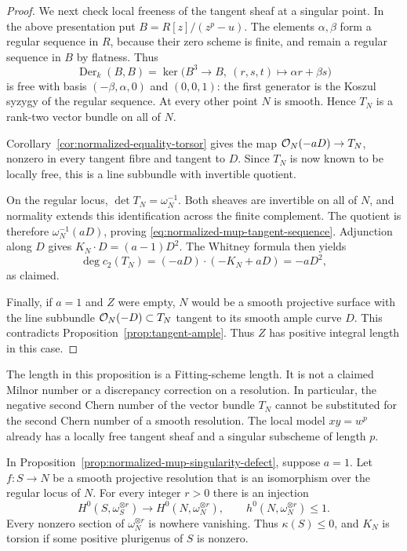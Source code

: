 \begin{proof}
We next check local freeness of the tangent sheaf at a singular
point. In the above presentation put $B=R[z]/(z^p-u)$.
The elements $\alpha,\beta$ form a regular sequence in $R$,
because their zero scheme is finite, and remain a regular sequence
in $B$ by flatness. Thus
\[
 \operatorname{Der}_k(B,B)
 =\ker\bigl(B^3\longrightarrow B,\ (r,s,t)\longmapsto
             \alpha r+\beta s\bigr)
\]
is free with basis $(-\beta,\alpha,0)$ and $(0,0,1)$: the first
generator is the Koszul syzygy of the regular sequence. At every
other point $N$ is smooth. Hence $T_N$ is a rank-two vector bundle
on all of $N$.

Corollary~\ref{cor:normalized-equality-torsor} gives the map
$\mathcal O_N(-aD)\to T_N$, nonzero in every tangent fibre and tangent
to $D$. Since $T_N$ is now known to be locally free, this is a
line subbundle with invertible quotient.

On the regular locus, $\det T_N=\omega_N^{-1}$. Both sheaves are
invertible on all of $N$, and normality extends this identification
across the finite complement. The quotient is therefore
$\omega_N^{-1}(aD)$, proving
\eqref{eq:normalized-mup-tangent-sequence}. Adjunction along $D$
gives $K_N\cdot D=(a-1)D^2$. The Whitney formula then yields
\[
 \deg c_2(T_N)=(-aD)\cdot(-K_N+aD)=-aD^2,
\]
as claimed.

Finally, if $a=1$ and $Z$ were empty, $N$ would be a smooth
projective surface with the line subbundle $\mathcal O_N(-D)\subset T_N$
tangent to its smooth ample curve $D$. This contradicts
Proposition~\ref{prop:tangent-ample}. Thus $Z$ has positive integral
length in this case.
\end{proof}

The length in this proposition is a Fitting-scheme length. It is not
a claimed Milnor number or a discrepancy correction on a resolution.
In particular, the negative second Chern number of the vector bundle
$T_N$ cannot be substituted for the second Chern number of a smooth
resolution. The local model $xy=w^p$ already has a locally free
tangent sheaf and a singular subscheme of length $p$.

\begin{corollary}\label{cor:normalized-mup-plurigenera}
In Proposition~\ref{prop:normalized-mup-singularity-defect}, suppose
$a=1$. Let $f:S\to N$ be a smooth projective resolution that is an
isomorphism over the regular locus of $N$. For every integer $r>0$
there is an injection
\[
 H^0(S,\omega_S^{\otimes r})\longrightarrow
 H^0(N,\omega_N^{\otimes r}),
 \qquad h^0(N,\omega_N^{\otimes r})\leq1.
\]
Every nonzero section of $\omega_N^{\otimes r}$ is nowhere
vanishing. Thus $\kappa(S)\leq0$, and $K_N$ is torsion if some
positive plurigenus of $S$ is nonzero.
\end{corollary}

